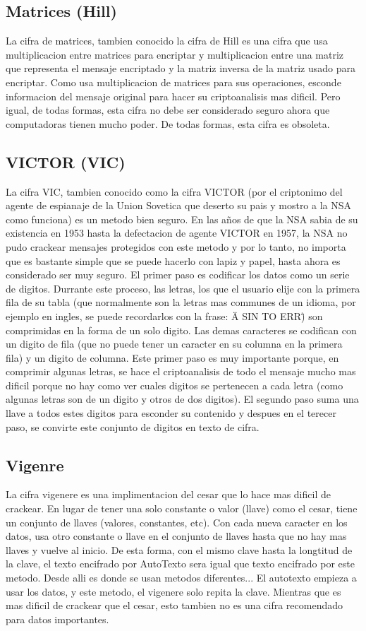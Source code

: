 \documentclass{article}
\begin{document}
		\subsection{Matrices (Hill)}
			La cifra de matrices, tambien conocido la cifra de Hill es una cifra que usa multiplicacion entre matrices para encriptar y multiplicacion entre una matriz que representa el mensaje encriptado y la matriz inversa de la matriz usado para encriptar. Como usa multiplicacion de matrices para sus operaciones, esconde informacion del mensaje original para hacer su criptoanalisis mas dificil. Pero igual, de todas formas, esta cifra no debe ser considerado seguro ahora que computadoras tienen mucho poder. De todas formas, esta cifra es obsoleta.
		\subsection{VICTOR (VIC)}
			La cifra VIC, tambien conocido como la cifra VICTOR (por el criptonimo del agente de espianaje de la Union Sovetica que deserto su pais y mostro a la NSA como funciona) es un metodo bien seguro. En las años de que la NSA sabia de su existencia en 1953 hasta la defectacion de agente VICTOR en 1957, la NSA no pudo crackear mensajes protegidos con este metodo y por lo tanto, no importa que es bastante simple que se puede hacerlo con lapiz y papel, hasta ahora es considerado ser muy seguro. El primer paso es codificar los datos como un serie de digitos. Durrante este proceso, las letras, los que el usuario elije con la primera fila de su tabla (que normalmente son la letras mas communes de un idioma, por ejemplo en ingles, se puede recordarlos con la frase: \"A SIN TO ERR\") son comprimidas en la forma de un solo digito. Las demas caracteres se codifican con un digito de fila (que no puede tener un caracter en su columna en la primera fila) y un digito de columna. Este primer paso es muy importante porque, en comprimir algunas letras, se hace el criptoanalisis de todo el mensaje mucho mas dificil porque no hay como ver cuales digitos se pertenecen a cada letra (como algunas letras son de un digito y otros de dos digitos). El segundo paso suma una llave a todos estes digitos para esconder su contenido y despues en el terecer paso, se convirte este conjunto de digitos en texto de cifra.
		\subsection{Vigenre}
			La cifra vigenere es una implimentacion del cesar que lo hace mas dificil de crackear. En lugar de tener una solo constante o valor (llave) como el cesar, tiene un conjunto de llaves (valores, constantes, etc). Con cada nueva caracter en los datos, usa otro constante o llave en el conjunto de llaves hasta que no hay mas llaves y vuelve al inicio. De esta forma, con el mismo clave hasta la longtitud de la clave, el texto encifrado por AutoTexto sera igual que texto encifrado por este metodo. Desde alli es donde se usan metodos diferentes... El autotexto empieza a usar los datos, y este metodo, el vigenere solo repita la clave. Mientras que es mas dificil de crackear que el cesar, esto tambien no es una cifra recomendado para datos importantes.
\end{document}
